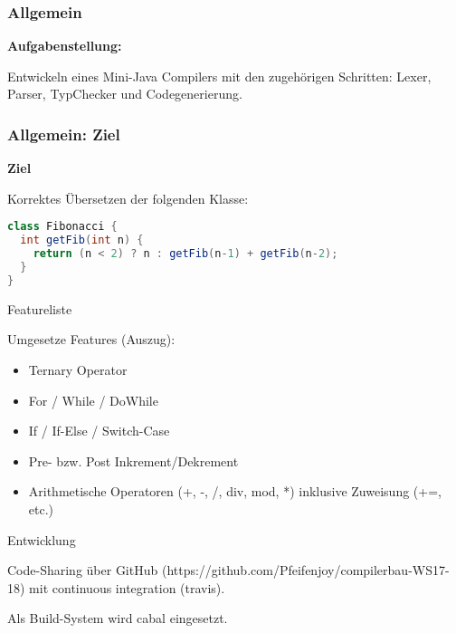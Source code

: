 \begin{frame}
	\frametitle{Allgemein}
	
\textbf{Aufgabenstellung:}

Entwickeln eines Mini-Java Compilers mit den zugehörigen Schritten: Lexer, Parser, TypChecker und Codegenerierung.
\end{frame}

\begin{frame}[fragile]
\frametitle{Allgemein: Ziel}

\textbf{Ziel} 

Korrektes Übersetzen der folgenden Klasse:

\begin{lstlisting}[language=Java]
class Fibonacci {
  int getFib(int n) {
    return (n < 2) ? n : getFib(n-1) + getFib(n-2);
  }
}
\end{lstlisting}	
\end{frame}



\begin{frame}{Featureliste}

Umgesetze Features (Auszug):

\begin{itemize}
	\item Ternary Operator
	\item For / While / DoWhile 
	\item If / If-Else / Switch-Case
	\item Pre- bzw. Post Inkrement/Dekrement
	\item Arithmetische Operatoren (+, -, /, div, mod, *) inklusive Zuweisung (+=, etc.)
\end{itemize}	
\end{frame}

\begin{frame}{Entwicklung}

Code-Sharing über GitHub (https://github.com/Pfeifenjoy/compilerbau-WS17-18) mit continuous integration (travis).

\par \medskip

Als Build-System wird cabal eingesetzt.	
\end{frame}

